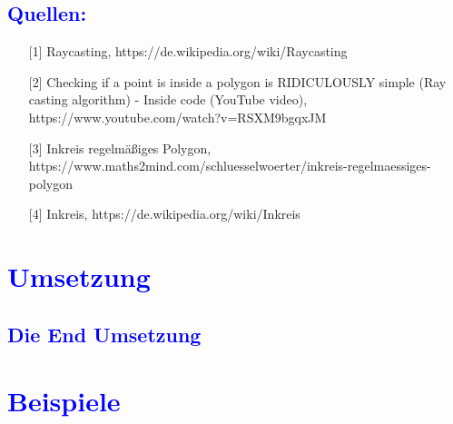 \documentclass{article}
\begin{document}
\subsection{\textcolor{blue}{Quellen:}}
\begin{itemize}
\item[\normalsize{[1]}] \normalsize{Raycasting, https://de.wikipedia.org/wiki/Raycasting}
\item[\normalsize{[2]}] \normalsize{Checking if a point is inside a polygon is RIDICULOUSLY simple (Ray casting algorithm) - Inside code (YouTube video), https://www.youtube.com/watch?v=RSXM9bgqxJM}
\item[\normalsize{[3]}] \normalsize{Inkreis regelmäßiges Polygon, https://www.maths2mind.com/schluesselwoerter/inkreis-regelmaessiges-polygon}
\item[\normalsize{[4]}] \normalsize{Inkreis, https://de.wikipedia.org/wiki/Inkreis}
\end{itemize}
\section{\textcolor{blue}{Umsetzung}}

\subsection{\textcolor{blue}{Die End Umsetzung}}

\section{\textcolor{blue}{Beispiele}}
\end{document}
